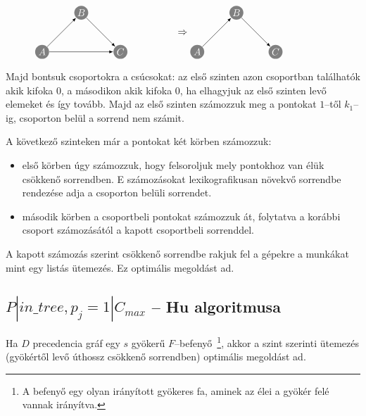 \[ \parbox[l]{5cm}{

\begin{tikzpicture}[scale=0.7]
  \tikzset{ p/.style={circle,white,fill=gray,inner sep=0pt,minimum size=0.5cm},
  }
  
  \node[p] (A) at (-2, 0) {$A$};
  \node[p] (B) at (0, 2) {$B$};
  \node[p] (C) at (2, 0) {$C$};
  
  \draw[-latex] (A) -- (B) node [midway, above] {};
  \draw[-latex] (B) -- (C) node [midway, above] {};
  \draw[-latex] (A) -- (C) node [midway, above] {};
\end{tikzpicture}
}
\Rightarrow
\parbox[l]{5cm}{

\begin{tikzpicture}[scale=0.7]
  \tikzset{ p/.style={circle,white,fill=gray,inner sep=0pt,minimum size=0.5cm},
  }
  
  \node[p] (A) at (-2, 0) {$A$};
  \node[p] (B) at (0, 2) {$B$};
  \node[p] (C) at (2, 0) {$C$};
  
  \draw[-latex] (A) -- (B) node [midway, above] {};
  \draw[-latex] (B) -- (C) node [midway, above] {};
\end{tikzpicture}
}
\]

Majd bontsuk csoportokra a csúcsokat: az első szinten azon csoportban találhatók
akik kifoka $0$, a másodikon akik kifoka $0$, ha elhagyjuk az első szinten levő
elemeket és így tovább. Majd az első szinten számozzuk meg a pontokat $1$--től
$k_1$--ig, csoporton belül a sorrend nem számit.

A következő szinteken már a pontokat két körben számozzuk:
\begin{itemize}
  \item első körben úgy számozzuk, hogy felsoroljuk mely pontokhoz van élük
  csökkenő sorrendben. E számozásokat lexikografikusan növekvő sorrendbe
  rendezése adja a csoporton belüli sorrendet.
  \item második körben a csoportbeli pontokat számozzuk át, folytatva a korábbi
  csoport számozásától a kapott csoportbeli sorrenddel.
\end{itemize}
 
A kapott számozás szerint csökkenő sorrendbe rakjuk fel a gépekre a munkákat mint
egy listás ütemezés. Ez optimális megoldást ad. 


\subsection{ \texorpdfstring {$ P|in\_tree, p_j=1|C_{max} $} {P|in-tree,pj=1|Cmax} -- Hu algoritmusa}

Ha $D$ precedencia gráf egy $s$ gyökerű $F$--befenyő~\footnote{A befenyő egy
olyan irányított gyökeres fa, aminek az élei a gyökér felé vannak irányítva.},
akkor a szint szerinti ütemezés (gyökértől levő úthossz csökkenő sorrendben)
optimális megoldást ad.
